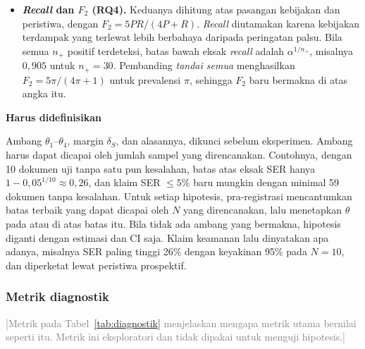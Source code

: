 \documentclass[journal,a4paper]{IEEEtran}
\newcommand{\en}[1]{\textit{#1}}
\newif\ifrancangan \rancangantrue
\newcommand{\kotak}[3]{\ifrancangan\par\begingroup\scriptsize
  \def\FrameCommand{\fboxsep=3pt\fboxrule=0.4pt\fcolorbox{#1!60!black}{#1!6}}%
  \MakeFramed{\advance\hsize-\width\FrameRestore}\noindent\textbf{#2}\par #3\endMakeFramed\endgroup\fi}
\newcommand{\definisikan}[1]{\kotak{teal}{Harus didefinisikan}{#1}}
\newcommand{\isian}[1]{\ifrancangan\textcolor{gray}{[#1]}\fi}
\begin{document}
{\begin{itemize}[leftmargin=*,nosep]
  \item \textbf{\en{Recall} dan $F_2$ (RQ4).} Keduanya dihitung atas pasangan kebijakan dan peristiwa, dengan $F_2 = 5PR/(4P+R)$. \en{Recall} diutamakan karena kebijakan terdampak yang terlewat lebih berbahaya daripada peringatan palsu. Bila semua $n_+$ positif terdeteksi, batas bawah eksak \en{recall} adalah $\alpha^{1/n_+}$, misalnya $0{,}905$ untuk $n_+ = 30$. Pembanding \emph{tandai semua} menghasilkan $F_2 = 5\pi/(4\pi+1)$ untuk prevalensi $\pi$, sehingga $F_2$ baru bermakna di atas angka itu.
\end{itemize}}

\definisikan{Ambang $\theta_1$--$\theta_4$, margin $\delta_S$, dan alasannya, dikunci sebelum eksperimen. Ambang harus dapat dicapai oleh jumlah sampel yang direncanakan. Contohnya, dengan 10 dokumen uji tanpa satu pun kesalahan, batas atas eksak SER hanya $1-0{,}05^{1/10} \approx 0{,}26$, dan klaim SER $\leq 5\%$ baru mungkin dengan minimal 59 dokumen tanpa kesalahan. Untuk setiap hipotesis, pra-registrasi mencantumkan batas terbaik yang dapat dicapai oleh $N$ yang direncanakan, lalu menetapkan $\theta$ pada atau di atas batas itu. Bila tidak ada ambang yang bermakna, hipotesis diganti dengan estimasi dan CI saja. Klaim keamanan lalu dinyatakan apa adanya, misalnya SER paling tinggi 26\% dengan keyakinan 95\% pada $N=10$, dan diperketat lewat peristiwa prospektif.}

\subsubsection{Metrik diagnostik}
\isian{Metrik pada Tabel~\ref{tab:diagnostik} menjelaskan mengapa metrik utama bernilai seperti itu. Metrik ini eksploratori dan tidak dipakai untuk menguji hipotesis.}
\end{document}
